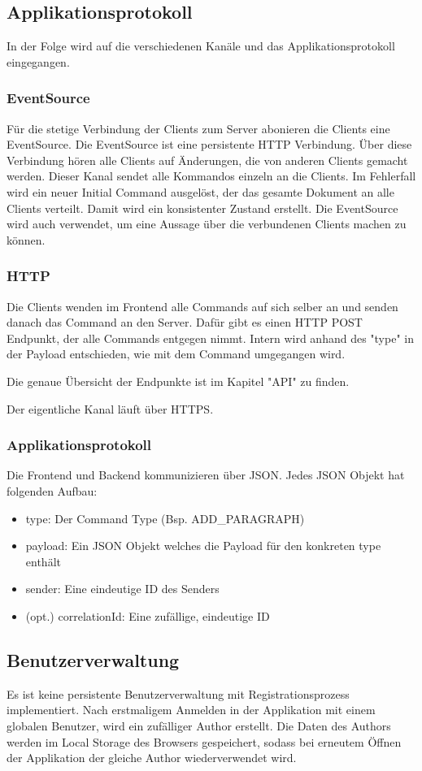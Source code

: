 \subsection{Applikationsprotokoll}
In der Folge wird auf die verschiedenen Kanäle und das Applikationsprotokoll eingegangen.

\subsubsection{EventSource}
Für die stetige Verbindung der Clients zum Server abonieren die Clients eine EventSource.
Die EventSource ist eine persistente HTTP Verbindung.
Über diese Verbindung hören alle Clients auf Änderungen, die von anderen Clients gemacht werden.
Dieser Kanal sendet alle Kommandos einzeln an die Clients.
Im Fehlerfall wird ein neuer Initial Command ausgelöst, der das gesamte Dokument an alle Clients verteilt.
Damit wird ein konsistenter Zustand erstellt.
Die EventSource wird auch verwendet, um eine Aussage über die verbundenen Clients machen zu können.

\subsubsection{HTTP}
Die Clients wenden im Frontend alle Commands auf sich selber an und senden danach das Command an den Server.
Dafür gibt es einen HTTP POST Endpunkt, der alle Commands entgegen nimmt.
Intern wird anhand des "type" in der Payload entschieden, wie mit dem Command umgegangen wird.

Die genaue Übersicht der Endpunkte ist im Kapitel "API" zu finden.

Der eigentliche Kanal läuft über HTTPS.

\subsubsection{Applikationsprotokoll}
Die Frontend und Backend kommunizieren über JSON.
Jedes JSON Objekt hat folgenden Aufbau:
\begin{itemize}
    \item type: Der Command Type (Bsp. ADD\_PARAGRAPH)
    \item payload: Ein JSON Objekt welches die Payload für den konkreten type enthält
    \item sender: Eine eindeutige ID des Senders
    \item (opt.) correlationId: Eine zufällige, eindeutige ID
\end{itemize}

\subsection{Benutzerverwaltung}
Es ist keine persistente Benutzerverwaltung mit Registrationsprozess implementiert.
Nach erstmaligem Anmelden in der Applikation mit einem globalen Benutzer, wird ein zufälliger Author erstellt.
Die Daten des Authors werden im Local Storage des Browsers gespeichert, sodass bei erneutem Öffnen der Applikation der gleiche Author wiederverwendet wird.
